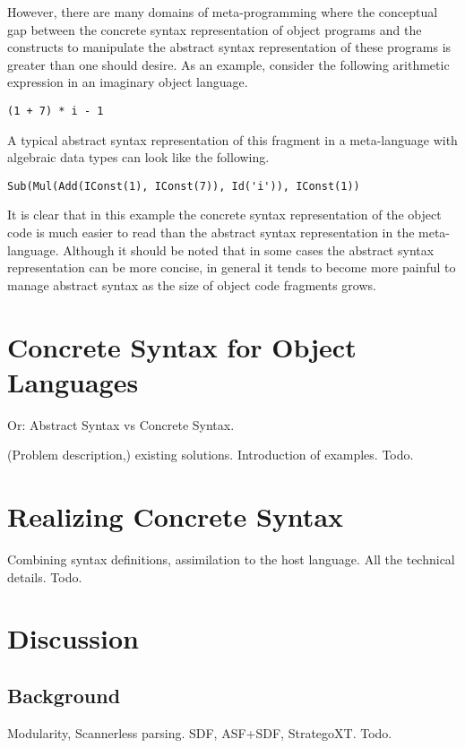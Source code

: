 \documentclass[a4paper,11pt]{article}
\begin{document}
However, there are many domains of meta-programming where the conceptual gap
between the concrete syntax representation of object programs and the constructs
to manipulate the abstract syntax representation of these programs is greater
than one should desire. As an example, consider the following arithmetic
expression in an imaginary object language.
\begin{lstlisting}[title=Example expression in concrete syntax]
(1 + 7) * i - 1
\end{lstlisting}
A typical abstract syntax representation of this fragment in a meta-language
with algebraic data types can look like the following.
\begin{lstlisting}[title=Example expression in abstract syntax]
Sub(Mul(Add(IConst(1), IConst(7)), Id('i')), IConst(1))
\end{lstlisting}
It is clear that in this example the concrete syntax representation of the
object code is much easier to read than the abstract syntax representation in
the meta-language. Although it should be noted that in some cases the abstract
syntax representation can be more concise, in general it tends to become more
painful to manage abstract syntax as the size of object code fragments grows.


\section{Concrete Syntax for Object Languages}

Or: Abstract Syntax vs Concrete Syntax.

(Problem description,) existing solutions.
Introduction of examples.
Todo.


\section{Realizing Concrete Syntax}

Combining syntax definitions, assimilation to the host language.
All the technical details.
Todo.


\section{Discussion}


\subsection{Background}

Modularity, Scannerless parsing.
SDF, ASF+SDF, StrategoXT.
Todo.
\end{document}
